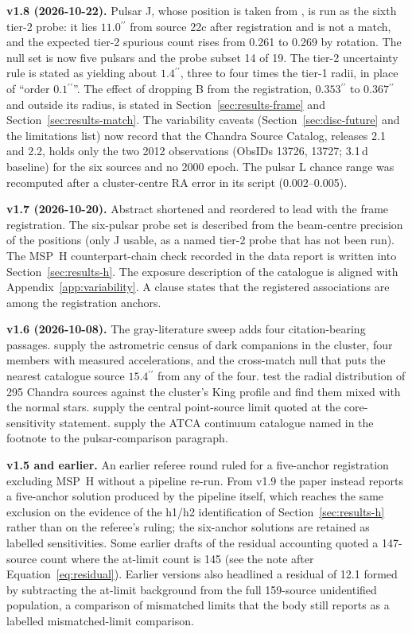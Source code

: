 \documentclass[11pt]{article}
\newcommand{\as}{\ensuremath{^{\prime\prime}}}
\begin{document}
\textbf{v1.8 (2026-10-22).} Pulsar J, whose position is taken from \citet{Chen2023}, is run as the sixth tier-2 probe: it lies $11.0\as$ from source 22c after registration and is not a match, and the expected tier-2 spurious count rises from 0.261 to 0.269 by rotation. The null set is now five pulsars and the probe subset 14 of 19. The tier-2 uncertainty rule is stated as yielding about $1.4\as$, three to four times the tier-1 radii, in place of ``order $0.1\as$''. The effect of dropping B from the registration, $0.353\as$ to $0.367\as$ and outside its radius, is stated in Section~\ref{sec:results-frame} and Section~\ref{sec:results-match}. The variability caveats (Section~\ref{sec:disc-future} and the limitations list) now record that the Chandra Source Catalog, releases 2.1 and 2.2, holds only the two 2012 observations (ObsIDs 13726, 13727; 3.1\,d baseline) for the six sources and no 2000 epoch. The pulsar L chance range was recomputed after a cluster-centre RA error in its script (0.002--0.005).

\textbf{v1.7 (2026-10-20).} Abstract shortened and reordered to lead with the frame registration. The six-pulsar probe set is described from the beam-centre precision of the \citet{Chen2023} positions (only J usable, as a named tier-2 probe that has not been run). The MSP~H counterpart-chain check recorded in the data report is written into Section~\ref{sec:results-h}. The exposure description of the catalogue is aligned with Appendix~\ref{app:variability}. A clause states that the registered associations are among the registration anchors.

\textbf{v1.6 (2026-10-08).} The gray-literature sweep adds four citation-bearing passages. \citet{Platais2024} supply the astrometric census of dark companions in the cluster, four members with measured accelerations, and the cross-match null that puts the nearest catalogue source $15.4\as$ from any of the four. \citet{Cheng2020} test the radial distribution of 295 Chandra sources against the cluster's King profile and find them mixed with the normal stars. \citet{Su2022} supply the central point-source limit quoted at the core-sensitivity statement. \citet{Tudor2022} supply the ATCA continuum catalogue named in the footnote to the pulsar-comparison paragraph.

\textbf{v1.5 and earlier.} An earlier referee round ruled for a five-anchor registration excluding MSP~H without a pipeline re-run. From v1.9 the paper instead reports a five-anchor solution produced by the pipeline itself, which reaches the same exclusion on the evidence of the h1/h2 identification of Section~\ref{sec:results-h} rather than on the referee's ruling; the six-anchor solutions are retained as labelled sensitivities. Some earlier drafts of the residual accounting quoted a 147-source count where the at-limit count is 145 (see the note after Equation~\eqref{eq:residual}). Earlier versions also headlined a residual of 12.1 formed by subtracting the at-limit background from the full 159-source unidentified population, a comparison of mismatched limits that the body still reports as a labelled mismatched-limit comparison.




\end{document}
